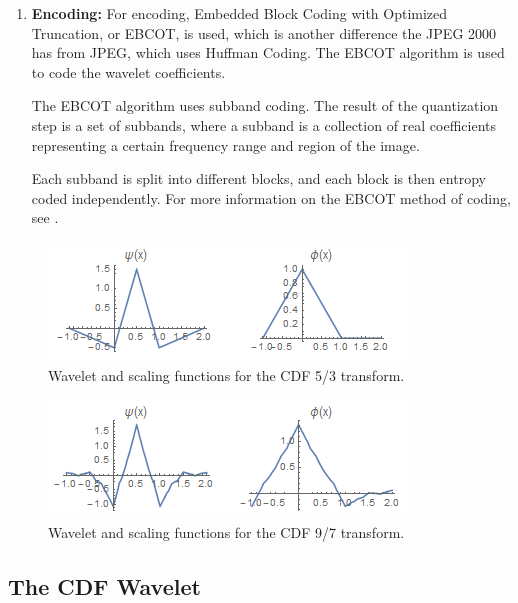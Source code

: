 \documentclass[titlepage,12pt]{article}
\begin{document}
\begin{enumerate}
	\item\textbf{Encoding:}
	For encoding, Embedded Block Coding with Optimized Truncation, or EBCOT, is used,
	which is another difference the JPEG 2000 has from JPEG, 
	which uses Huffman Coding.
	The EBCOT algorithm is used to code the wavelet coefficients.
	
	The EBCOT algorithm uses subband coding.
	The result of the quantization step is a set of subbands, 
	where a subband is a collection of real coefficients representing a certain
	frequency range and region of the image.
	
	Each subband is split into different blocks,
	and each block is then entropy coded independently.\cite{hp}
	For more information on the EBCOT method of coding, 
	see \cite{ebcot}.
	
\end{enumerate}

\begin{figure}[h]
	\centering
	\includegraphics[scale=0.9]{resources/lossless_family.png}
	\caption{Wavelet and scaling functions for the CDF 5/3 transform.}
	\label{fig:lossless_family}
\end{figure}

\begin{figure}[h]
	\centering
	\includegraphics[scale=0.9]{resources/lossy_family.png}
	\caption{Wavelet and scaling functions for the CDF 9/7 transform.}
	\label{fig:lossy_family}
\end{figure}

\subsection{The CDF Wavelet}
\end{document}
